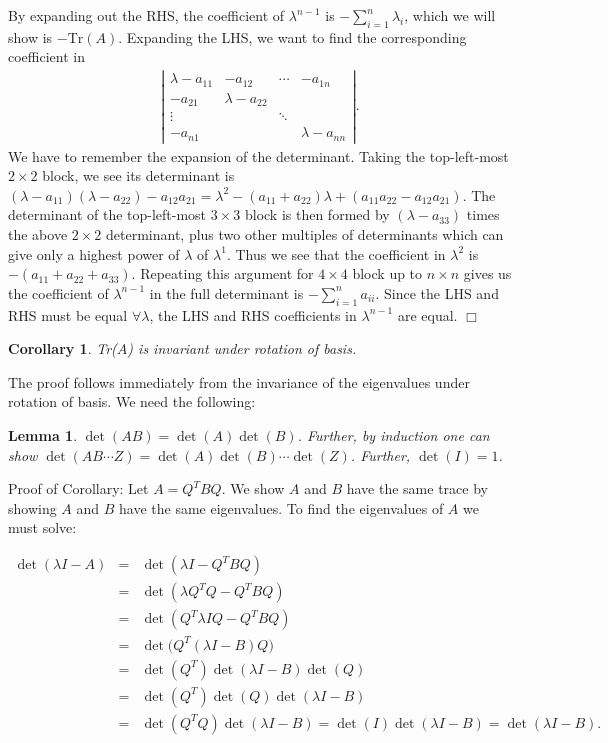 \documentclass[12pt,letterpaper]{report}
\newcommand\bea{\begin{eqnarray}}
\newcommand\eea{\end{eqnarray}}
\newcommand{\done}{\Box} %
\newtheorem{cor}[thm]{Corollary}
\newtheorem{lem}[thm]{Lemma}
\begin{document}
By expanding out the RHS, the coefficient of $\lambda^{n-1}$ is
$-\sum_{i=1}^n \lambda_i$, which we will show is $-\mbox{Tr}(A)$.
Expanding the LHS, we want to find the corresponding coefficient
in \bea \left|\begin{array}{llll}\lambda-a_{11} & -a_{12} & \cdots
& -a_{1n} \\ -a_{21} & \lambda-a_{22} & & \\ \vdots&&\ddots &\\
-a_{n1}&&& \lambda-a_{nn}
\end{array} \right| . \nonumber
\eea We have to remember the expansion of the determinant. Taking
the top-left-most $2\times 2$ block, we see its determinant is
$(\lambda-a_{11})(\lambda-a_{22}) - a_{12}a_{21} = \lambda^2 -
(a_{11} + a_{22})\lambda + (a_{11}a_{22} - a_{12}a_{21})$. The
determinant of the top-left-most $3\times3$ block is then formed
by $(\lambda-a_{33})$ times the above $2\times2$ determinant, plus
two other multiples of determinants which can give only a highest
power of $\lambda$ of $\lambda^1$. Thus we see that the
coefficient in $\lambda^2$ is $-(a_{11} + a_{22} + a_{33})$.
Repeating this argument for $4\times4$ block up to $ n\times n$
gives us the coefficient of $\lambda^{n-1}$ in the full
determinant is $-\sum_{i=1}^n a_{ii}$. Since the LHS and RHS must
be equal $\forall \lambda$, the LHS and RHS coefficients in
$\lambda^{n-1}$ are equal. $\done$

\begin{cor}
Tr($A$) is invariant under rotation of basis.
\end{cor}
The proof follows immediately from the invariance of the
eigenvalues under rotation of basis. We need the following:

\begin{lem} $\det(AB) = \det(A) \det(B)$. Further, by induction one
can show $\det(AB \cdots Z) = \det(A) \det(B) \cdots \det(Z)$.
Further, $\det(I) = 1$.
\end{lem}

Proof of Corollary: Let $A = Q^TBQ$. We show $A$ and $B$ have the
same trace by showing $A$ and $B$ have the same eigenvalues. To
find the eigenvalues of $A$ we must solve:

\bea \det(\lambda I - A) &=& \det(\lambda I - Q^T B Q) \nonumber\\
&=& \det(\lambda Q^T Q - Q^T B Q) \nonumber\\ &=& \det(Q^T \lambda
I Q - Q^T B Q) \nonumber\\ &=& \det\Big( Q^T (\lambda I - B) Q
\Big) \nonumber\\ &=& \det(Q^T) \det(\lambda I - B) \det(Q)
\nonumber\\ &=& \det(Q^T) \det(Q) \det(\lambda I - B) \nonumber\\
&=& \det(Q^T Q) \det(\lambda I - B) = \det(I) \det(\lambda I - B)
= \det(\lambda I - B). \nonumber\\ \eea
\end{document}
